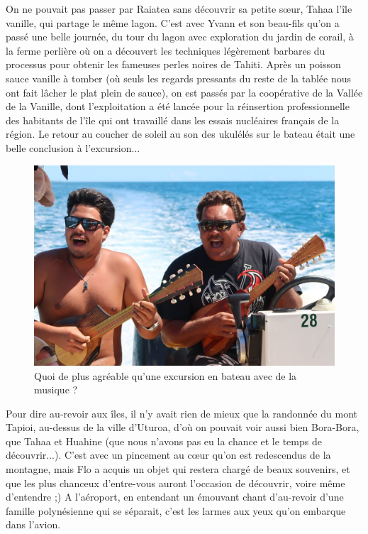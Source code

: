 On ne pouvait pas passer par Raiatea sans découvrir sa petite sœur,
Tahaa l'île vanille, qui partage le même lagon. C'est avec Yvann et son
beau-fils qu'on a passé une belle journée, du tour du lagon avec
exploration du jardin de corail, à la ferme perlière où on a découvert
les techniques légèrement barbares du processus pour obtenir les
fameuses perles noires de Tahiti. Après un poisson sauce vanille à
tomber (où seuls les regards pressants du reste de la tablée nous ont
fait lâcher le plat plein de sauce), on est passés par la coopérative de
la Vallée de la Vanille, dont l'exploitation a été lancée pour la
réinsertion professionnelle des habitants de l'île qui ont travaillé
dans les essais nucléaires français de la région. Le retour au coucher
de soleil au son des ukulélés sur le bateau était une belle conclusion à
l'excursion...

\begin{figure}
\centering
\includegraphics{images/20180820_tahaa.JPG}
\caption{Quoi de plus agréable qu'une excursion en bateau avec de la
musique ?}
\end{figure}

Pour dire au-revoir aux îles, il n'y avait rien de mieux que la
randonnée du mont Tapioi, au-dessus de la ville d'Uturoa, d'où on
pouvait voir aussi bien Bora-Bora, que Tahaa et Huahine (que nous
n'avons pas eu la chance et le temps de découvrir...). C'est avec un
pincement au cœur qu'on est redescendus de la montagne, mais Flo a
acquis un objet qui restera chargé de beaux souvenirs, et que les plus
chanceux d'entre-vous auront l'occasion de découvrir, voire même
d'entendre ;) A l'aéroport, en entendant un émouvant chant d'au-revoir
d'une famille polynésienne qui se séparait, c'est les larmes aux yeux
qu'on embarque dans l'avion.

